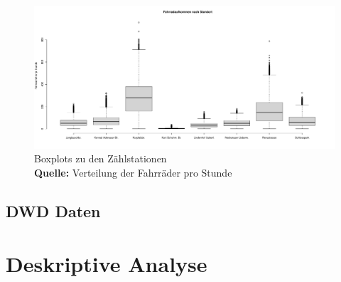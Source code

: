 \documentclass[a4paper,12pt]{thesis}
\newcommand*{\captionsource}[2]{%
	\caption[{#1}]{%
		#1%
		\\\hspace{\linewidth}%
		\textbf{Quelle:} #2%
	}%
}
\begin{document}
\begin{figure}[!ht]
	\centering
	\includegraphics[width=\textwidth]{Plots/Boxplot_Stationen.pdf}
	\captionsource{Boxplots zu den Zählstationen}{
		Verteilung der Fahrräder pro Stunde
	}
	\label{BoxplotStationen}
\end{figure}

\section{DWD Daten}


\chapter{Deskriptive Analyse}
\end{document}
